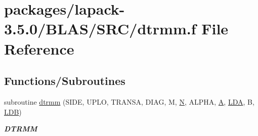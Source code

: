 \hypertarget{lapack-3_85_80_2BLAS_2SRC_2dtrmm_8f}{}\section{packages/lapack-\/3.5.0/\+B\+L\+A\+S/\+S\+R\+C/dtrmm.f File Reference}
\label{lapack-3_85_80_2BLAS_2SRC_2dtrmm_8f}
\subsection*{Functions/\+Subroutines}
\begin{DoxyCompactItemize}
\item 
subroutine \hyperlink{group__double__blas__level3_gaf07edfbb2d2077687522652c9e283e1e}{dtrmm} (S\+I\+D\+E, U\+P\+L\+O, T\+R\+A\+N\+S\+A, D\+I\+A\+G, M, \hyperlink{polmisc_8c_a0240ac851181b84ac374872dc5434ee4}{N}, A\+L\+P\+H\+A, \hyperlink{classA}{A}, \hyperlink{example__user_8c_ae946da542ce0db94dced19b2ecefd1aa}{L\+D\+A}, B, \hyperlink{example__user_8c_a50e90a7104df172b5a89a06c47fcca04}{L\+D\+B})
\begin{DoxyCompactList}\small\item\em {\bfseries D\+T\+R\+M\+M} \end{DoxyCompactList}\end{DoxyCompactItemize}
